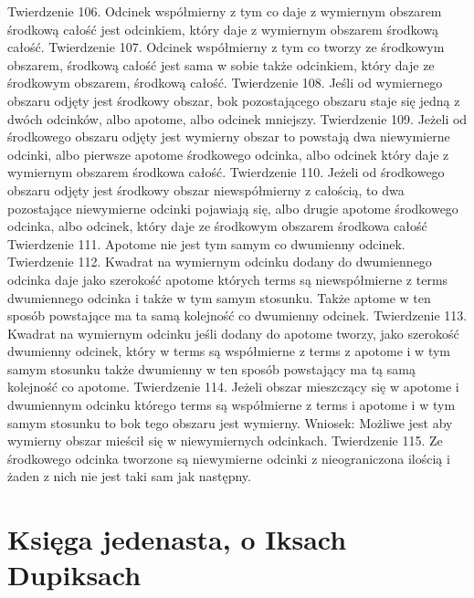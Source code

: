     Twierdzenie 106.
        Odcinek współmierny z tym co daje z wymiernym obszarem środkową całość jest odcinkiem, który daje z wymiernym obszarem środkową całość.
    Twierdzenie 107.
        Odcinek współmierny z tym co tworzy ze środkowym obszarem, środkową całość jest sama w sobie także odcinkiem, który daje ze środkowym obszarem, środkową całość.
    Twierdzenie 108.
        Jeśli od wymiernego obszaru odjęty jest środkowy obszar, bok pozostającego obszaru staje się jedną z dwóch odcinków, albo apotome, albo odcinek mniejszy.
    Twierdzenie 109.
        Jeżeli od środkowego obszaru odjęty jest wymierny obszar to powstają dwa niewymierne odcinki, albo pierwsze apotome środkowego odcinka, albo odcinek który daje z wymiernym obszarem środkowa całość.
    Twierdzenie 110.
        Jeżeli od środkowego obszaru odjęty jest środkowy obszar niewspółmierny z całością, to dwa pozostające niewymierne odcinki pojawiają się, albo drugie apotome środkowego odcinka, albo odcinek, który daje ze środkowym obszarem środkowa całość
    Twierdzenie 111.
        Apotome nie jest tym samym co dwumienny odcinek.
    Twierdzenie 112.
        Kwadrat na wymiernym odcinku dodany do dwumiennego odcinka daje jako szerokość apotome których terms są niewspółmierne z terms dwumiennego odcinka i także w tym samym stosunku. Także aptome w ten sposób powstające ma ta samą kolejność co dwumienny odcinek.
    Twierdzenie 113.
        Kwadrat na wymiernym odcinku jeśli dodany do apotome tworzy, jako szerokość dwumienny odcinek, który w terms są współmierne z terms z apotome i w tym samym stosunku także dwumienny w ten sposób powstający ma tą samą kolejność co apotome.
    Twierdzenie 114.
        Jeżeli obszar mieszczący się w apotome i dwumiennym odcinku którego terms są współmierne z terms i apotome i w tym samym stosunku to bok tego obszaru jest wymierny.
        Wniosek:
        Możliwe jest aby wymierny obszar mieścił się w niewymiernych odcinkach.
    Twierdzenie 115.
        Ze środkowego odcinka tworzone są niewymierne odcinki z nieograniczona ilością i żaden z nich nie jest taki sam jak następny. 


        
\section{Księga jedenasta, o Iksach Dupiksach}

